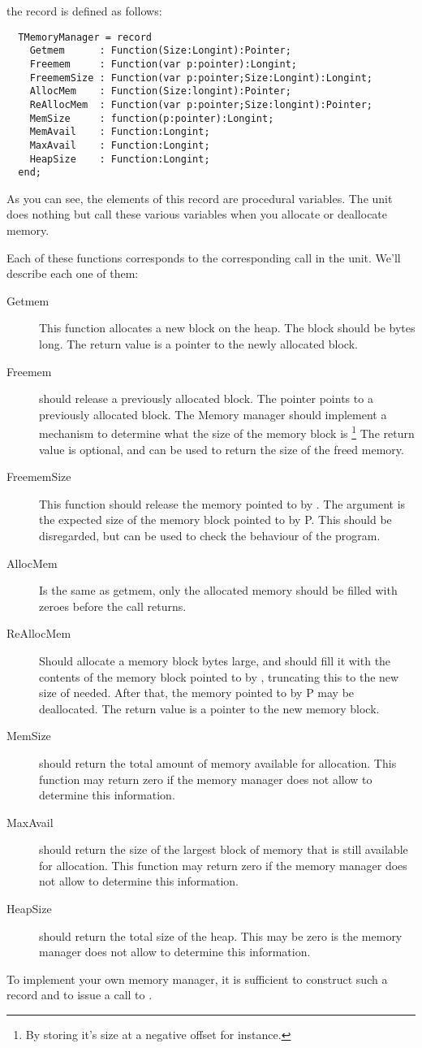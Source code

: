 the  record is defined as follows:
\begin{verbatim}
  TMemoryManager = record
    Getmem      : Function(Size:Longint):Pointer;
    Freemem     : Function(var p:pointer):Longint;
    FreememSize : Function(var p:pointer;Size:Longint):Longint;
    AllocMem    : Function(Size:longint):Pointer;
    ReAllocMem  : Function(var p:pointer;Size:longint):Pointer;
    MemSize     : function(p:pointer):Longint;
    MemAvail    : Function:Longint;
    MaxAvail    : Function:Longint;
    HeapSize    : Function:Longint;
  end;
\end{verbatim}

As you can see, the elements of this record are procedural variables.
The  unit does nothing but call these various variables when you
allocate or deallocate memory.

Each of these functions corresponds to the corresponding call in the 
unit. We'll describe each one of them:
\begin{description}
\item[Getmem] This function allocates a new block on the heap. The block
should be  bytes long. The return value is a pointer to the newly
allocated block.
\item[Freemem] should release a previously allocated block. The pointer
 points to a previously allocated block. The Memory manager should
implement a mechanism to determine what the size of the memory block is
\footnote{By storing it's size at a negative offset for instance.} The
return value is optional, and can be used to return the size of the freed
memory.
\item[FreememSize] This function should release the memory pointed to by
. The argument  is the expected size of the memory block
pointed to by P. This should be disregarded, but can be used to check the
behaviour of the program.
\item[AllocMem] Is the same as getmem, only the allocated memory should
be filled with zeroes before the call returns.
\item[ReAllocMem] Should allocate a memory block  bytes large,
and should fill it with the contents of the memory block pointed to by
, truncating this to the new size of needed. After that, the memory
pointed to by P may be deallocated. The return value is a pointer to the
new memory block.
\item[MemSize] should return the total amount of memory available for
allocation. This function may return zero if the memory manager does not
allow to determine this information.
\item[MaxAvail] should return the size of the largest block of memory that
is still available for allocation. This function may return zero if the
memory manager does not allow to determine this information.
\item[HeapSize] should return the total size of the heap. This may be zero
is the memory manager does not allow to determine this information.
\end{description}
To implement your own memory manager, it is sufficient to construct such a
record and to issue a call to .

